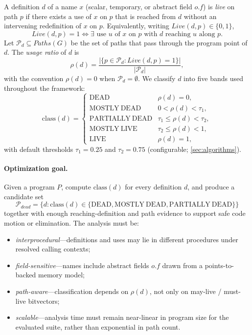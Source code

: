 \documentclass[acmsmall,screen,review,anonymous]{acmart}
\begin{document}
A definition $d$ of a name $x$ (scalar, temporary, or abstract field $o.f$) is \emph{live} on path $p$ if there exists a use of $x$ on $p$ that is reached from $d$ without an intervening redefinition of $x$ on $p$. Equivalently, writing $\mathit{Live}(d,p)\in\{0,1\}$,
\begin{equation}
  \mathit{Live}(d,p)=1 \iff
  \exists\text{ use }u\text{ of }x\text{ on }p\text{ with }d\text{ reaching }u\text{ along }p.
\end{equation}
Let $\mathcal{P}_d\subseteq\mathit{Paths}(G)$ be the set of paths that pass through the program point of $d$. The \emph{usage ratio} of $d$ is
\begin{equation}
  \rho(d)=\frac{|\{p\in\mathcal{P}_d:\mathit{Live}(d,p)=1\}|}{|\mathcal{P}_d|},
\end{equation}
with the convention $\rho(d)=0$ when $\mathcal{P}_d=\emptyset$. We classify $d$ into five bands used throughout the framework:
\begin{equation}
  \mathrm{class}(d)=
  \begin{cases}
  \mathrm{DEAD} & \rho(d)=0,\\
  \mathrm{MOSTLY\ DEAD} & 0<\rho(d)<\tau_1,\\
  \mathrm{PARTIALLY\ DEAD} & \tau_1\le\rho(d)<\tau_2,\\
  \mathrm{MOSTLY\ LIVE} & \tau_2\le\rho(d)<1,\\
  \mathrm{LIVE} & \rho(d)=1,
  \end{cases}
\end{equation}
with default thresholds $\tau_1=0.25$ and $\tau_2=0.75$ (configurable; \autoref{sec:algorithms}).

\paragraph{Optimization goal.}
Given a program $P$, compute $\mathrm{class}(d)$ for every definition $d$, and produce a candidate set
\begin{equation}
  \mathcal{P}_{dead}=\{d:\mathrm{class}(d)\in\{\mathrm{DEAD},\mathrm{MOSTLY\ DEAD},\mathrm{PARTIALLY\ DEAD}\}\}
\end{equation}
together with enough reaching-definition and path evidence to support safe code motion or elimination. The analysis must be:
\begin{itemize}[leftmargin=*,itemsep=1pt]
\item \emph{interprocedural}---definitions and uses may lie in different procedures under resolved calling contexts;
\item \emph{field-sensitive}---names include abstract fields $o.f$ drawn from a points-to-backed memory model;
\item \emph{path-aware}---classification depends on $\rho(d)$, not only on may-live / must-live bitvectors;
\item \emph{scalable}---analysis time must remain near-linear in program size for the evaluated suite, rather than exponential in path count.
\end{itemize}
\end{document}
